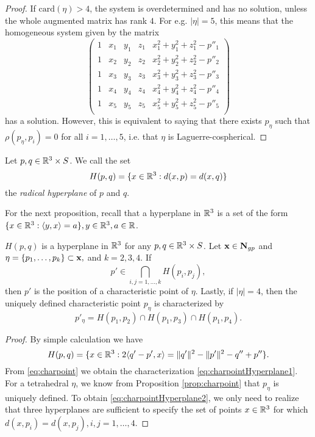\begin{proof}
	If $\mathrm{card}(\eta)>4$, the system is overdetermined and has no solution, unless the whole augmented matrix has rank $4$. For e.g. $|\eta|=5$, this means that the homogeneous system given by the matrix 
	\begin{equation}\label{circmat}
	\begin{pmatrix}
		1 & x_1 & y_1 & z_1 & x_1^2 + y_1^2 + z_1^2 - p''_1  \\
		1 & x_2 & y_2 & z_2 & x_2^2 + y_2^2 + z_2^2 - p''_2  \\
		1 & x_3 & y_3 & z_3 & x_3^2 + y_3^2 + z_3^2 - p''_3  \\
		1 & x_4 & y_4 & z_4 & x_4^2 + y_4^2 + z_4^2 - p''_4  \\
		1 & x_5 & y_5 & z_5 & x_5^2 + y_5^2 + z_5^2 - p''_5  \\
	\end{pmatrix}
	\end{equation}
	has a solution. However, this is equivalent to saying that there exists $p_\eta$ such that $\rho(p_\eta,p_i)=0$ for all $i=1,\dots,5$, i.e. that $\eta$ is Laguerre-cospherical.
\end{proof}

\begin{definition} Let $p,q \in {\mathbb R^3}\times S$. We call the set 
	$$H(p,q) = \{ x\in {\mathbb R^3}: d(x,p) = d(x,q) \}$$
	the \textit{radical hyperplane} of $p$ and $q$.
\end{definition}

For the next proposition, recall that a hyperplane in ${\mathbb R^3}$ is a set of the form $\{x\in {\mathbb R^3}: \langle y, x \rangle = a\}, y\in {\mathbb R^3}, a\in \mathbb R$.

\begin{proposition}\label{prop:charpointHyperplane} $H(p,q)$ is a hyperplane in ${\mathbb R^3}$ for any $p,q\in{\mathbb R^3}\times S$. Let ${\mathbf{x}}\in \mathbf N_{gp}$ and $\eta=\{p_1,\dots,p_k\} \subset{\mathbf{x}},$ and $ k=2,3,4$. If 
	\begin{equation}\label{eq:charpointHyperplane1}p'\in\bigcap_{i,j=1,\dots,k} H(p_i,p_j),\end{equation}
	then $p'$ is the position of a characteristic point of $\eta$. Lastly, if $|\eta|=4$, then the uniquely defined characteristic point $p_\eta$ is characterized by
	\begin{equation}\label{eq:charpointHyperplane2}p'_\eta = H(p_1,p_2)\cap H(p_1,p_3) \cap H(p_1,p_4).\end{equation}
\end{proposition}
\begin{proof}
	By simple calculation we have
	$$H(p,q) = \{x \in {\mathbb R^3}: 2 \langle q'-p',x \rangle  = \|q'\|^2 - \|p'\|^2  - q'' + p''\}.$$
	From \eqref{eq:charpoint} we obtain the characterization \eqref{eq:charpointHyperplane1}. 
	For a tetrahedral $\eta$, we know from Proposition \ref{prop:charpoint} that $p_\eta$ is uniquely defined. To obtain \eqref{eq:charpointHyperplane2}, we only need to realize that three hyperplanes are sufficient to specify the set of points $x\in {\mathbb R^3}$ for which $d(x,p_i)=d(x,p_j), i,j=1,\dots,4$.
\end{proof}

